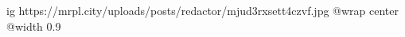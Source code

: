  
 
 
 
 

\ifcmt
  ig https://mrpl.city/uploads/posts/redactor/mjud3rxsett4czvf.jpg
  @wrap center
  @width 0.9
\fi
